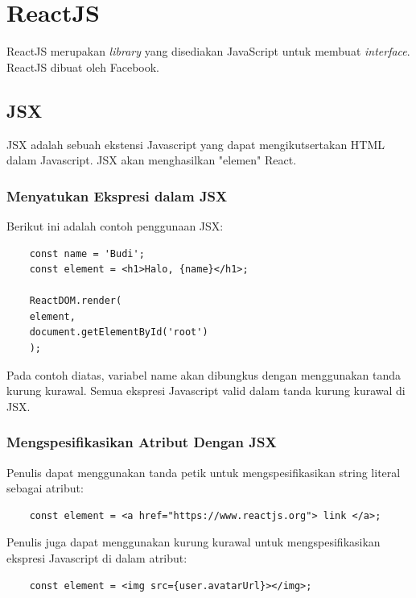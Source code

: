 \section{ReactJS}
ReactJS merupakan \textit{library} yang disediakan JavaScript untuk membuat \textit{interface}. ReactJS dibuat oleh Facebook. 
%

\subsection{JSX}
JSX adalah sebuah ekstensi Javascript yang dapat mengikutsertakan HTML dalam Javascript. JSX akan menghasilkan "elemen" React. 
\subsubsection{Menyatukan Ekspresi dalam JSX}
Berikut ini adalah contoh penggunaan JSX:
\begin{lstlisting}
	const name = 'Budi';
	const element = <h1>Halo, {name}</h1>;
	
	ReactDOM.render(
	element,
	document.getElementById('root')
	);
\end{lstlisting}
Pada contoh diatas, variabel name akan dibungkus dengan menggunakan tanda kurung kurawal. Semua ekspresi Javascript valid dalam tanda kurung kurawal di JSX. 
\subsubsection{Mengspesifikasikan Atribut Dengan JSX}
Penulis dapat menggunakan tanda petik untuk mengspesifikasikan string literal sebagai atribut:
\begin{lstlisting}
	const element = <a href="https://www.reactjs.org"> link </a>;
\end{lstlisting}
 Penulis juga dapat menggunakan kurung kurawal untuk mengspesifikasikan ekspresi Javascript di dalam atribut:
 \begin{lstlisting}
 	const element = <img src={user.avatarUrl}></img>;
 \end{lstlisting}

